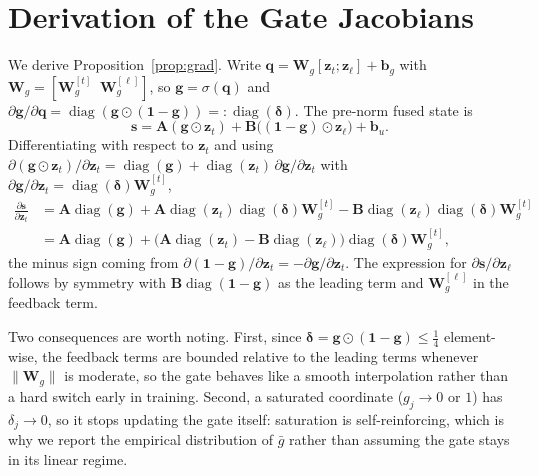 \section{Derivation of the Gate Jacobians}
\label{app:jacobian}

We derive Proposition~\ref{prop:grad}. Write $\mathbf{q}=\mathbf{W}_g[\mathbf{z}_t;\mathbf{z}_\ell]+\mathbf{b}_g$ with
$\mathbf{W}_g=[\mathbf{W}_g^{[t]}\;\;\mathbf{W}_g^{[\ell]}]$, so $\mathbf{g}=\sigma(\mathbf{q})$ and
$\partial\mathbf{g}/\partial\mathbf{q}=\operatorname{diag}(\mathbf{g}\odot(\mathbf{1}-\mathbf{g}))=:\operatorname{diag}(\bm{\delta})$.
The pre-norm fused state is
\begin{equation}
\mathbf{s}=\mathbf{A}(\mathbf{g}\odot\mathbf{z}_t)+\mathbf{B}\big((\mathbf{1}-\mathbf{g})\odot\mathbf{z}_\ell\big)+\mathbf{b}_u .
\end{equation}
Differentiating with respect to $\mathbf{z}_t$ and using $\partial(\mathbf{g}\odot\mathbf{z}_t)/\partial\mathbf{z}_t
=\operatorname{diag}(\mathbf{g})+\operatorname{diag}(\mathbf{z}_t)\,\partial\mathbf{g}/\partial\mathbf{z}_t$ with
$\partial\mathbf{g}/\partial\mathbf{z}_t=\operatorname{diag}(\bm{\delta})\mathbf{W}_g^{[t]}$,
\begin{align}
\frac{\partial\mathbf{s}}{\partial\mathbf{z}_t}
&=\mathbf{A}\operatorname{diag}(\mathbf{g})
+\mathbf{A}\operatorname{diag}(\mathbf{z}_t)\operatorname{diag}(\bm{\delta})\mathbf{W}_g^{[t]}
-\mathbf{B}\operatorname{diag}(\mathbf{z}_\ell)\operatorname{diag}(\bm{\delta})\mathbf{W}_g^{[t]}\\
&=\mathbf{A}\operatorname{diag}(\mathbf{g})
+\big(\mathbf{A}\operatorname{diag}(\mathbf{z}_t)-\mathbf{B}\operatorname{diag}(\mathbf{z}_\ell)\big)\operatorname{diag}(\bm{\delta})\mathbf{W}_g^{[t]},
\end{align}
the minus sign coming from $\partial(\mathbf{1}-\mathbf{g})/\partial\mathbf{z}_t=-\partial\mathbf{g}/\partial\mathbf{z}_t$.
The expression for $\partial\mathbf{s}/\partial\mathbf{z}_\ell$ follows by symmetry with
$\mathbf{B}\operatorname{diag}(\mathbf{1}-\mathbf{g})$ as the leading term and $\mathbf{W}_g^{[\ell]}$ in the feedback term.

Two consequences are worth noting. First, since $\bm{\delta}=\mathbf{g}\odot(\mathbf{1}-\mathbf{g})\le\frac14$
element-wise, the feedback terms are bounded relative to the leading terms whenever
$\lVert\mathbf{W}_g\rVert$ is moderate, so the gate behaves like a smooth interpolation rather than a hard
switch early in training. Second, a saturated coordinate ($g_j\!\to\!0$ or $1$) has
$\delta_j\!\to\!0$, so it stops updating the gate itself: saturation is self-reinforcing, which is why we
report the empirical distribution of $\bar g$ rather than assuming the gate stays in its linear regime.

